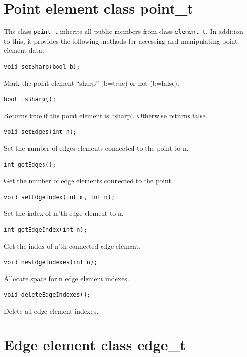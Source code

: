 \section{Point element class point\_t}

The class {\tt point\_t} inherits all public members from class {\tt element\_t}.
In addition to this, it provides the following methods for accessing and
manipulating point element data:
\begin{verbatim}
void setSharp(bool b);
\end{verbatim}
Mark the point element ``sharp'' (b=true) or not (b=false).
\begin{verbatim}
bool isSharp();
\end{verbatim}
Returns true if the point element is ``sharp''. Otherwise returns false.
\begin{verbatim}
void setEdges(int n);
\end{verbatim}
Set the number of edges elements connected to the point to n.
\begin{verbatim}
int getEdges();
\end{verbatim}
Get the number of edge elements connected to the point.
\begin{verbatim}
void setEdgeIndex(int m, int n);
\end{verbatim}
Set the index of m'th edge element to n.
\begin{verbatim}
int getEdgeIndex(int n);
\end{verbatim}
Get the index of n'th connected edge element.
\begin{verbatim}
void newEdgeIndexes(int n);
\end{verbatim}
Allocate space for n edge element indexes.
\begin{verbatim}
void deleteEdgeIndexes();
\end{verbatim}
Delete all edge element indexes.

\section{Edge element class edge\_t}

